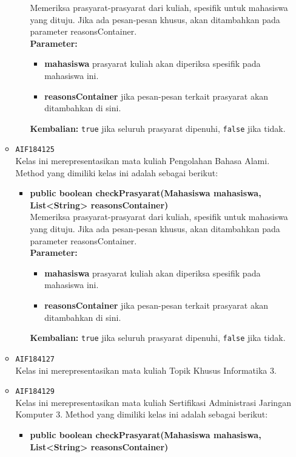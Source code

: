 \begin{enumerate}
\begin{itemize}
\begin{itemize}
Memeriksa prasyarat-prasyarat dari kuliah, spesifik untuk mahasiswa yang dituju. Jika ada pesan-pesan khusus, akan ditambahkan pada parameter reasonsContainer.\\
\textbf{Parameter:}
\begin{itemize}
\item \textbf{mahasiswa} prasyarat kuliah akan diperiksa spesifik pada mahasiswa ini.
\item \textbf{reasonsContainer} jika pesan-pesan terkait prasyarat akan ditambahkan di sini.
\end{itemize}
\textbf{Kembalian:} \texttt{true} jika seluruh prasyarat dipenuhi, \texttt{false} jika tidak.
\end{itemize}
\item \texttt{AIF184125} \\
Kelas ini merepresentasikan mata kuliah Pengolahan Bahasa Alami. Method yang dimiliki kelas ini adalah sebagai berikut: 
\begin{itemize}
\item \textbf{public boolean checkPrasyarat(Mahasiswa mahasiswa, List<String> reasonsContainer)}\\
Memeriksa prasyarat-prasyarat dari kuliah, spesifik untuk mahasiswa yang dituju. Jika ada pesan-pesan khusus, akan ditambahkan pada parameter reasonsContainer.\\
\textbf{Parameter:}
\begin{itemize}
\item \textbf{mahasiswa} prasyarat kuliah akan diperiksa spesifik pada mahasiswa ini.
\item \textbf{reasonsContainer} jika pesan-pesan terkait prasyarat akan ditambahkan di sini.
\end{itemize}
\textbf{Kembalian:} \texttt{true} jika seluruh prasyarat dipenuhi, \texttt{false} jika tidak.
\end{itemize}
\item \texttt{AIF184127} \\
Kelas ini merepresentasikan mata kuliah Topik Khusus Informatika 3.
\item \texttt{AIF184129} \\
Kelas ini merepresentasikan mata kuliah Sertifikasi Administrasi Jaringan Komputer 3. Method yang dimiliki kelas ini adalah sebagai berikut: 
\begin{itemize}
\item \textbf{public boolean checkPrasyarat(Mahasiswa mahasiswa, List<String> reasonsContainer)}\\

\end{itemize}
\end{itemize}
\end{enumerate}
